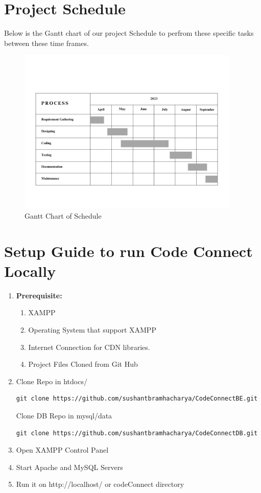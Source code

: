 \section{Project Schedule}
Below is the Gantt chart of our project Schedule to perfrom these specific tasks between these time frames.
\begin{figure}[H]
    \centering
        \includegraphics[width=400px]{Diagrams/Gantt_Chart.png}
    \caption{Gantt Chart of Schedule}
\end{figure}

\section{Setup Guide to run Code Connect Locally}
\begin{enumerate}
    \item \textbf{Prerequisite:}
    \begin{enumerate}
        \item XAMPP
        \item Operating System that support XAMPP
        \item Internet Connection for CDN libraries.
        \item Project Files Cloned from Git Hub
    \end{enumerate}
    \item Clone Repo in htdocs/\\
    \begin{verbatim}
git clone https://github.com/sushantbramhacharya/CodeConnectBE.git
    \end{verbatim}
    Clone DB Repo in mysql/data\\
    \begin{verbatim}
git clone https://github.com/sushantbramhacharya/CodeConnectDB.git
    \end{verbatim}
    \item Open XAMPP Control Panel
    \item Start Apache and MySQL Servers
    \item Run it on http://localhost/ or codeConnect directory
\end{enumerate}

